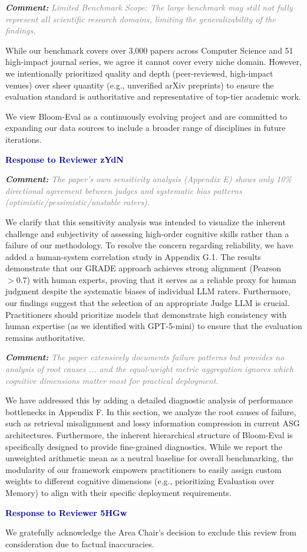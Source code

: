 \documentclass[11pt, a4paper]{article}
\newcommand{\reviewer}[1]{\vspace{0.5cm}\noindent\textbf{\large \textcolor{darkblue}{#1}}}
\newcommand{\comment}[1]{%
    \par\vspace{1em}%
    \noindent\textbf{\textit{Comment:}} \textit{\textcolor{gray}{#1}}%
}
\begin{document}
\comment{Limited Benchmark Scope: The large benchmark may still not fully represent all scientific research domains, limiting the generalizability of the findings.}

While our benchmark covers over 3,000 papers across Computer Science and 51 high-impact journal series, we agree it cannot cover every niche domain. However, we intentionally prioritized quality and depth (peer-reviewed, high-impact venues) over sheer quantity (e.g., unverified arXiv preprints) to ensure the evaluation standard is authoritative and representative of top-tier academic work. 

We view Bloom-Eval as a continuously evolving project and are committed to expanding our data sources to include a broader range of disciplines in future iterations.

\reviewer{Response to Reviewer zYdN}

\comment{The paper's own sensitivity analysis (Appendix E) shows only 10\% directional agreement between judges and systematic bias patterns (optimistic/pessimistic/unstable raters).}

We clarify that this sensitivity analysis was intended to visualize the inherent challenge and subjectivity of assessing high-order cognitive skills rather than a failure of our methodology. To resolve the concern regarding reliability, we have added a human-system correlation study in Appendix G.1. The results demonstrate that our GRADE approach achieves strong alignment (Pearson $>0.7$) with human experts, proving that it serves as a reliable proxy for human judgment despite the systematic biases of individual LLM raters. Furthermore, our findings suggest that the selection of an appropriate Judge LLM is crucial. Practitioners should prioritize models that demonstrate high consistency with human expertise (as we identified with GPT-5-mini) to ensure that the evaluation remains authoritative.

\comment{The paper extensively documents failure patterns but provides no analysis of root causes ... and the equal-weight metric aggregation ignores which cognitive dimensions matter most for practical deployment.}


We have addressed this by adding a detailed diagnostic analysis of performance bottlenecks in Appendix F. In this section, we analyze the root causes of failure, such as retrieval misalignment and lossy information compression in current ASG architectures. Furthermore, the inherent hierarchical structure of Bloom-Eval is specifically designed to provide fine-grained diagnostics. While we report the unweighted arithmetic mean as a neutral baseline for overall benchmarking, the modularity of our framework empowers practitioners to easily assign custom weights to different cognitive dimensions (e.g., prioritizing Evaluation over Memory) to align with their specific deployment requirements.

\reviewer{Response to Reviewer 5HGw}

We gratefully acknowledge the Area Chair's decision to exclude this review from consideration due to factual inaccuracies.



\end{document}
